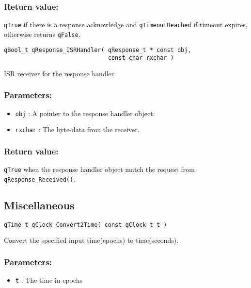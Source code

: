 \subsubsection*{Return value:}
\lstinline{qTrue} if there is a response acknowledge and \lstinline{qTimeoutReached} if timeout expires,  otherwise returns \lstinline{qFalse}.

\noindent\hrulefill

\begin{lstlisting}[style=CStyle]
qBool_t qResponse_ISRHandler( qResponse_t * const obj, 
                              const char rxchar )
\end{lstlisting}

ISR receiver for the response handler. 

\subsubsection*{Parameters:}
\begin{itemize}
    \item \lstinline{obj} : A pointer to the response handler object.
    \item \lstinline{rxchar} : The byte-data from the receiver.
\end{itemize}

\subsubsection*{Return value:}
\lstinline{qTrue} when the response handler object match the request from \lstinline{qResponse_Received()}.

\subsection{Miscellaneous}

\begin{lstlisting}[style=CStyle]
qTime_t qClock_Convert2Time( const qClock_t t )
\end{lstlisting}

Convert the specified input time(epochs) to time(seconds). 

\subsubsection*{Parameters:}
\begin{itemize}
    \item \lstinline{t} : The time in epochs
\end{itemize}


